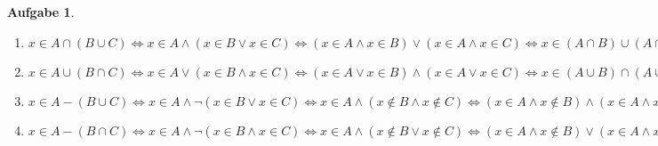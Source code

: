 \documentclass[a4paper,11pt,parskip=half,fleqn]{scrartcl}
\theoremstyle{note}
\newtheorem{aufgabe}{Aufgabe}
\begin{document}
\begin{aufgabe}
  \begin{enumerate}
    \item $x\in A\cap (B\cup C)\iff x\in A\land (x\in B\lor x\in C)\iff (x\in A\land x\in B)\lor (x\in A\land x\in C)\iff x\in (A\cap B)\cup (A\cap C)$
    \item $x\in A\cup (B\cap C)\iff x\in A\lor (x\in B\land x\in C)\iff (x\in A\lor x\in B)\land (x\in A\lor x\in C)\iff x\in (A\cup B)\cap (A\cup C)$
    \item $x\in A-(B\cup C)\iff x\in A\land \neg (x\in B\lor x\in C)\iff x\in A\land (x\not\in B\land x\not\in C)\iff
      (x\in A\land x\not\in B)\land (x\in A\land x\not\in C)\iff x\in (A-B)\cup (A-C)$
    \item $x\in A-(B\cap C)\iff x\in A\land \neg (x\in B\land x\in C)\iff x\in A\land (x\not\in B\lor x\not\in C)\iff
      (x\in A\land x\not\in B)\lor (x\in A\land x\not\in C)\iff x\in (A-B)\cup (A-C)$
  \end{enumerate}
\end{aufgabe}
\end{document}
